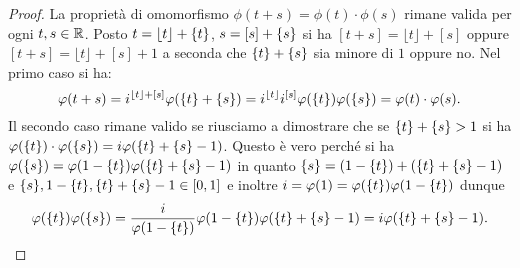 \begin{proof}
La proprietà di omomorfismo $\phi(t+s)=\phi(t)\cdot\phi(s)$ 
rimane valida per ogni $t,s\in{\mathbb R}$.
Posto $t=\lfloor t \rfloor +{\left\{ t \right\}}$, $s=[s]+{\left\{ s \right\}}$ si ha 
$[t+s]=\lfloor t \rfloor +[s]$ oppure $[t+s]=\lfloor t \rfloor +[s]+1$ a seconda che 
${\left\{ t \right\}}+{\left\{ s \right\}}$ sia minore di $1$ oppure no.
Nel primo caso si ha:
\[
\varphi(t+s) = i^{\lfloor t \rfloor +[s]}\varphi({\left\{ t \right\}}+{\left\{ s \right\}})
  = i^{\lfloor t \rfloor }i^{[s]}\varphi({\left\{ t \right\}})\varphi({\left\{ s \right\}})
  = \varphi(t)\cdot\varphi(s).
\]
Il secondo caso rimane valido se riusciamo a dimostrare che 
se ${\left\{ t \right\}}+{\left\{ s \right\}}>1$ si ha 
$\varphi({\left\{ t \right\}})\cdot \varphi({\left\{ s \right\}}) = i\varphi({\left\{ t \right\}}+{\left\{ s \right\}}-1)$.
Questo è vero perché si ha
$\varphi({\left\{ s \right\}})=\varphi(1-{\left\{ t \right\}})\varphi({\left\{ t \right\}}+{\left\{ s \right\}}-1)$ in quanto 
${\left\{ s \right\}}=(1-{\left\{ t \right\}})+({\left\{ t \right\}}+{\left\{ s \right\}}-1)$ 
e ${\left\{ s \right\}},1-{\left\{ t \right\}},{\left\{ t \right\}}+{\left\{ s \right\}}-1\in[0,1]$
e inoltre $i=\varphi(1)=\varphi({\left\{ t \right\}})\varphi(1-{\left\{ t \right\}})$
dunque 
\[
\varphi({\left\{ t \right\}})\varphi({\left\{ s \right\}}) 
  = \frac{i}{\varphi(1-{\left\{ t \right\}})}\varphi(1-{\left\{ t \right\}})\varphi({\left\{ t \right\}}+{\left\{ s \right\}}-1)
  = i \varphi({\left\{ t \right\}}+{\left\{ s \right\}}-1).
\]
\end{proof}

